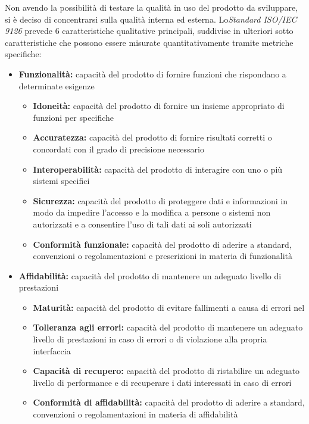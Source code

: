 \documentclass[12pt,a4paper]{article}
\begin{document}
Non avendo la possibilità di testare la qualità in uso del prodotto  da sviluppare, si è deciso di concentrarsi sulla qualità interna ed esterna. Lo\textit{Standard ISO/IEC 9126} prevede 6 caratteristiche qualitative principali, suddivise in ulteriori sotto caratteristiche che possono essere misurate quantitativamente tramite metriche specifiche:

\begin{itemize}
	\item \textbf{Funzionalità:} capacità del prodotto  di fornire funzioni che rispondano a determinate esigenze
	\begin{itemize}
		\item \textbf{Idoneità:} capacità del prodotto  di fornire un insieme appropriato di funzioni per  specifiche
		\item \textbf{Accuratezza:} capacità del prodotto  di fornire risultati corretti o concordati con il grado di precisione necessario
		\item \textbf{Interoperabilità:} capacità del prodotto  di interagire con uno o più sistemi specifici
		\item \textbf{Sicurezza:} capacità del prodotto  di proteggere dati e informazioni in modo da impedire l'accesso e la modifica a persone o sistemi non autorizzati e a consentire l'uso di tali dati ai soli autorizzati
		\item \textbf{Conformità funzionale:} capacità del prodotto  di aderire a standard, convenzioni o regolamentazioni e prescrizioni in materia di funzionalità
	\end{itemize}
	
	\item \textbf{Affidabilità:} capacità del prodotto  di mantenere un adeguato livello di prestazioni
	\begin{itemize}
		\item \textbf{Maturità:} capacità del prodotto  di evitare fallimenti a causa di errori nel  
		\item \textbf{Tolleranza agli errori: }capacità del prodotto  di mantenere un adeguato livello di prestazioni in caso di errori  o di violazione alla propria interfaccia
		\item \textbf{Capacità di recupero:} capacità del prodotto  di ristabilire un adeguato livello di performance e di recuperare i dati interessati in caso di errori
		\item \textbf{Conformità di affidabilità:} capacità del prodotto  di aderire a standard, convenzioni o regolamentazioni in materia di affidabilità
	\end{itemize}
	

\end{itemize}
\end{document}
